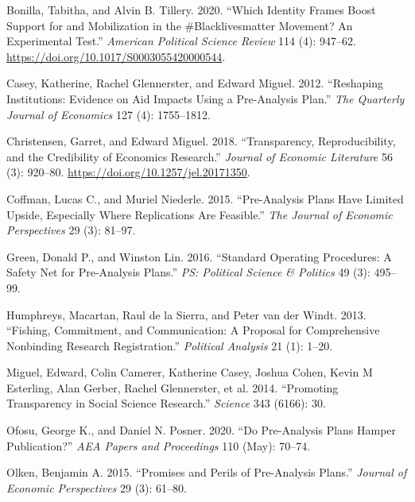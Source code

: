 \documentclass[
]{article}
\begin{document}
\hypertarget{refs}{}
\leavevmode\hypertarget{ref-bonilla_tillery_2020}{}%
Bonilla, Tabitha, and Alvin B. Tillery. 2020. ``Which Identity Frames
Boost Support for and Mobilization in the \#Blacklivesmatter Movement?
An Experimental Test.'' \emph{American Political Science Review} 114
(4): 947--62. \url{https://doi.org/10.1017/S0003055420000544}.

\leavevmode\hypertarget{ref-Casey2012}{}%
Casey, Katherine, Rachel Glennerster, and Edward Miguel. 2012.
``Reshaping Institutions: Evidence on Aid Impacts Using a Pre-Analysis
Plan.'' \emph{The Quarterly Journal of Economics} 127 (4): 1755--1812.

\leavevmode\hypertarget{ref-Christensen2018}{}%
Christensen, Garret, and Edward Miguel. 2018. ``Transparency,
Reproducibility, and the Credibility of Economics Research.''
\emph{Journal of Economic Literature} 56 (3): 920--80.
\url{https://doi.org/10.1257/jel.20171350}.

\leavevmode\hypertarget{ref-Coffman2015}{}%
Coffman, Lucas C., and Muriel Niederle. 2015. ``Pre-Analysis Plans Have
Limited Upside, Especially Where Replications Are Feasible.'' \emph{The
Journal of Economic Perspectives} 29 (3): 81--97.

\leavevmode\hypertarget{ref-Green2015}{}%
Green, Donald P., and Winston Lin. 2016. ``Standard Operating
Procedures: A Safety Net for Pre-Analysis Plans.'' \emph{PS: Political
Science \& Politics} 49 (3): 495--99.

\leavevmode\hypertarget{ref-Humphreys2013a}{}%
Humphreys, Macartan, Raul de la Sierra, and Peter van der Windt. 2013.
``Fishing, Commitment, and Communication: A Proposal for Comprehensive
Nonbinding Research Registration.'' \emph{Political Analysis} 21 (1):
1--20.

\leavevmode\hypertarget{ref-Miguel2014}{}%
Miguel, Edward, Colin Camerer, Katherine Casey, Joshua Cohen, Kevin M
Esterling, Alan Gerber, Rachel Glennerster, et al. 2014. ``Promoting
Transparency in Social Science Research.'' \emph{Science} 343 (6166):
30.

\leavevmode\hypertarget{ref-Ofosu2020}{}%
Ofosu, George K., and Daniel N. Posner. 2020. ``Do Pre-Analysis Plans
Hamper Publication?'' \emph{AEA Papers and Proceedings} 110 (May):
70--74.

\leavevmode\hypertarget{ref-Olken2015}{}%
Olken, Benjamin A. 2015. ``Promises and Perils of Pre-Analysis Plans.''
\emph{Journal of Economic Perspectives} 29 (3): 61--80.
\end{document}

